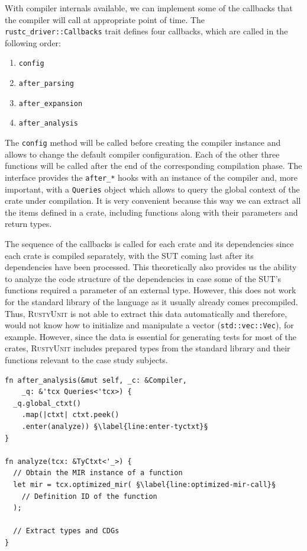 \documentclass[paper=a4,%
  twoside,%
  BCOR4mm,%
  abstract=true,%
  toc=bibliography,%
  chapterprefix=true,%
  toc=bibliographynumbered,%
  open=right,%
  english,%
  pagesize=pdftex]{scrreprt}
\newcommand{\tech}{\textsc{RustyUnit}\xspace}
\newcommand{\sut}{\ac{SUT}\xspace}
\begin{document}
With compiler internals available, we can implement some of the callbacks that the compiler will call at appropriate point of time. The \texttt{rustc\string_driver::Callbacks} trait defines four callbacks, which are called in the following order:
\begin{enumerate}
    \item \texttt{config}
    \item \texttt{after\string_parsing}
    \item \texttt{after\string_expansion}
    \item \texttt{after\string_analysis}
\end{enumerate}

The \texttt{config} method will be called before creating the compiler instance and allows to change the default compiler configuration. Each of the other three functions will be called after the end of the corresponding compilation phase. The interface provides the \texttt{after\string_*} hooks with an instance of the compiler and, more important, with a \texttt{Queries} object which allows to query the global context of the crate under compilation. It is very convenient because this way we can extract all the items defined in a crate, including functions along with their parameters and return types. %

The sequence of the callbacks is called for each crate and its dependencies since each crate is compiled separately, with the \sut coming last after its dependencies have been processed. This theoretically also provides us the ability to analyze the code structure of the dependencies in case some of the \sut's functions required a parameter of an external type. However, this does not work for the standard library of the language as it usually already comes precompiled. Thus, \tech is not able to extract this data automatically and therefore, would not know how to initialize and manipulate a vector (\texttt{std::vec::Vec}), for example. However, since the data is essential for generating tests for most of the crates, \tech includes prepared types from the standard library and their functions relevant to the case study subjects.

\begin{lstlisting}[style=boxed, caption={We can register a listener function to analyze the code structure of the compiled crate}, escapechar=§, label=lst:optimized-mir]
fn after_analysis(&mut self, _c: &Compiler,
    _q: &'tcx Queries<'tcx>) {
  _q.global_ctxt()
    .map(|ctxt| ctxt.peek()
    .enter(analyze)) §\label{line:enter-tyctxt}§
}

fn analyze(tcx: &TyCtxt<'_>) {
  // Obtain the MIR instance of a function
  let mir = tcx.optimized_mir( §\label{line:optimized-mir-call}§
    // Definition ID of the function
  );

  // Extract types and CDGs
}
\end{lstlisting}
\end{document}
